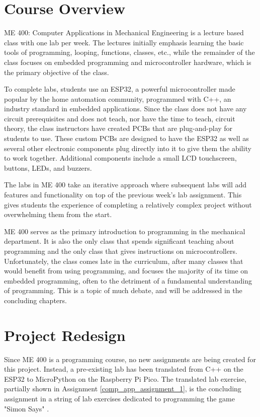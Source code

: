 \section{Course Overview}

ME 400: Computer Applications in Mechanical Engineering is a lecture based class with
one lab per week. The lectures initially emphasis learning the basic tools of
programming, looping, functions, classes, etc., while the remainder of the class
focuses on embedded programming and microcontroller hardware, which is the primary
objective of the class.

To complete labs, students use an ESP32, a powerful microcontroller made popular by
the home automation community, programmed with C++, an industry standard in embedded
applications. Since the class does not have any circuit prerequisites and does not 
teach, nor have the time to teach, circuit theory, the class instructors have created
PCBs that are plug-and-play for students to use. These custom PCBs are designed to have
the ESP32 as well as several other electronic components plug directly into it to
give them the ability to work together. Additional components include a small LCD 
touchscreen, buttons, LEDs, and buzzers. 

The labs in ME 400 take an iterative approach where subsequent labs will add features
and functionality on top of the previous week's lab assignment. This gives students
the experience of completing a relatively complex project without overwhelming them 
from the start. 

ME 400 serves as the primary introduction to programming in the mechanical department.
It is also the only class that spends significant teaching about programming and the
only class that gives instructions on microcontrollers. Unfortunately, the class comes
late in the curriculum, after many classes that would benefit from using programming,
and focuses the majority of its time on embedded programming, often to the detriment
of a fundamental understanding of programming. This is a topic of much debate, and
will be addressed in the concluding chapters.

\section{Project Redesign}

Since ME 400 is a programming course, no new assignments are being created for this
project. Instead, a pre-existing lab has been translated from C++ on the ESP32 to
MicroPython on the Raspberry Pi Pico. The translated lab exercise, partially shown in 
Assignment \ref{comp_app_assignment_1}, is the concluding
assignment in a string of lab exercises dedicated to programming the game "Simon Says"
\cite{simon-says}.


